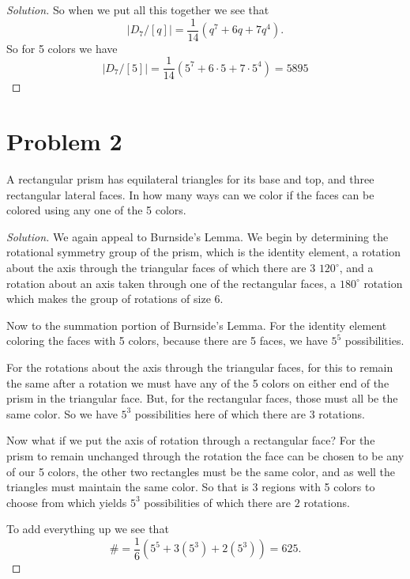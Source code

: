\documentclass[12pt]{amsart}
\newenvironment{solution}
{\begin{proof}[Solution]}
{\end{proof}}
\begin{document}
\begin{onehalfspace}
\begin{solution}
            So when we put all this together we see that
            \[
                |D_7/[q]| = \frac{1}{14}(q^7 + 6q + 7q^4).
            \]
            So for 5 colors we have
            \[
                |D_7/[5]| = \frac{1}{14}(5^7 + 6\cdot 5 + 7\cdot 5^4) = 5895
            \]
        \end{solution}

        \section{Problem 2}
        A rectangular prism has equilateral triangles for its base and top, and three rectangular lateral faces.
        In how many ways can we color if the faces can be colored using any one of the 5 colors.

        \begin{solution}
            We again appeal to Burnside's Lemma.
            We begin by determining the rotational symmetry group of the prism, which
            is the identity element, a rotation about the axis through the triangular faces of which there are 3 $120^\circ$, and
            a rotation about an axis taken through one of the rectangular faces, a $180^\circ$ rotation which makes the group of
            rotations of size 6.

            Now to the summation portion of Burnside's Lemma.
            For the identity element coloring the faces with 5 colors, because there are 5 faces, we have $5^5$
            possibilities.

            For the rotations about the axis through the triangular faces, for this to remain the same after a rotation
            we must have any of the 5 colors on either end of the prism in the triangular face.
            But, for the rectangular faces, those must all be the same color.
            So we have $5^3$ possibilities here of which there are $3$ rotations.

            Now what if we put the axis of rotation through a rectangular face?
            For the prism to remain unchanged through the rotation the face can be chosen to be any of our 5 colors,
            the other two rectangles must be the same color, and as well the triangles must maintain the same color.
            So that is 3 regions with 5 colors to choose from which yields $5^3$ possibilities of which there are $2$
            rotations.

            To add everything up we see that
            \[
                \#=\frac{1}{6}(5^5 + 3(5^3) + 2(5^3)) = 625.
            \]
        \end{solution}


\end{onehalfspace}
\end{document}
